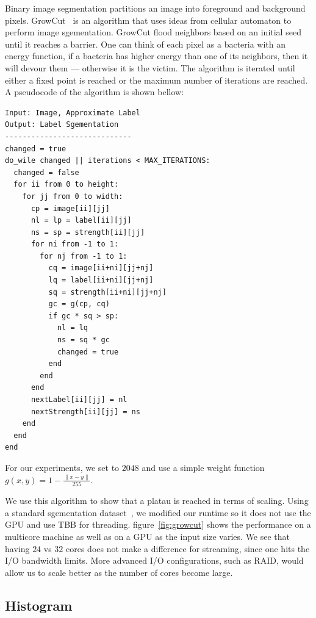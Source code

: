 Binary image segmentation partitions an image into foreground and background
  pixels.
GrowCut~\cite{vezhnevets2005growcut} is an algorithm that uses ideas from cellular automaton to perform image
  sgementation.
GrowCut flood
  neighbors based on an initial seed until it reaches a barrier.
One can think of each pixel as a bacteria with an energy function, if a bacteria has
  higher energy than one of its neighbors, then it will devour them --- otherwise it
  is the victim.
The algorithm is iterated until either a fixed point is reached or the maximum number
  of iterations are reached.
A pseudocode of the algorithm is shown bellow:


\begin{lstlisting}
Input: Image, Approximate Label
Output: Label Sgementation
-----------------------------
changed = true
do_wile changed || iterations < MAX_ITERATIONS:
  changed = false
  for ii from 0 to height:
    for jj from 0 to width:
      cp = image[ii][jj]
      nl = lp = label[ii][jj]
      ns = sp = strength[ii][jj]
      for ni from -1 to 1:
        for nj from -1 to 1:
          cq = image[ii+ni][jj+nj]
          lq = label[ii+ni][jj+nj]
          sq = strength[ii+ni][jj+nj]
          gc = g(cp, cq)
          if gc * sq > sp:
            nl = lq
            ns = sq * gc
            changed = true
          end
        end
      end
      nextLabel[ii][jj] = nl
      nextStrength[ii][jj] = ns
    end
  end
end
\end{lstlisting}

For our experiments, we set  to $2048$ and use a
  simple weight function $g(x,y)  = 1 - \frac{\|x - y\|}{255}$.

We use this algorithm to show that a platau is reached in terms of scaling.
Using a standard sgementation dataset~\cite{gridcut}, we modified our runtime so
  it does not use the GPU and use TBB for threading. figure~\ref{fig:growcut} shows the
  performance on a multicore machine as well as on a GPU as the input
  size varies.
We see that having $24$ vs $32$ cores does not make a difference for streaming, since
  one hits the I/O bandwidth limits.
More advanced I/O configurations, such as RAID, would allow us to scale better as the number of cores become large. 

\subsection{Histogram}

